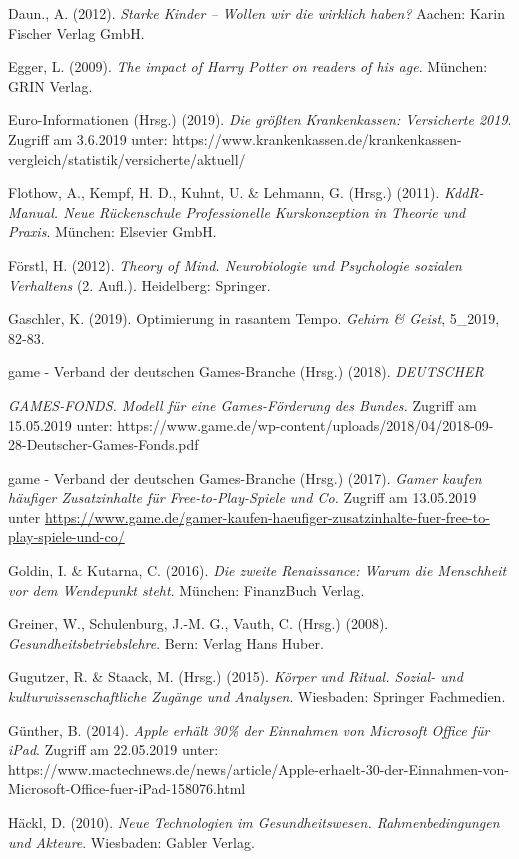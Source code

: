 \documentclass[
  a4paper,
  DIV=11,
  numbers=noendperiod,
  onecolumn,
  oneside,
  a4paper]{scrartcl}
\begin{document}
Daun., A. (2012). \emph{Starke Kinder -- Wollen wir die wirklich haben?
}Aachen: Karin Fischer Verlag GmbH.

Egger, L. (2009). \emph{The impact of Harry Potter on readers of his
age}. München: GRIN Verlag.

Euro-Informationen (Hrsg.) (2019). \emph{Die größten Krankenkassen:
Versicherte 2019}. Zugriff am 3.6.2019 unter:
https://www.krankenkassen.de/krankenkassen-vergleich/statistik/versicherte/aktuell/

Flothow, A., Kempf, H. D., Kuhnt, U. \& Lehmann, G. (Hrsg.) (2011).
\emph{KddR-Manual. Neue Rückenschule Professionelle Kurskonzeption in
Theorie und Praxis}. München: Elsevier GmbH.

Förstl, H. (2012). \emph{Theory of Mind. Neurobiologie und Psychologie
sozialen Verhaltens} (2. Aufl.). Heidelberg: Springer.

Gaschler, K. (2019). Optimierung in rasantem Tempo. \emph{Gehirn \&
Geist}, 5\_2019, 82-83.

game - Verband der deutschen Games-Branche (Hrsg.) (2018).
\emph{DEUTSCHER}

\emph{GAMES-FONDS. Modell für eine Games-Förderung des Bundes. }Zugriff
am 15.05.2019 unter:
https://www.game.de/wp-content/uploads/2018/04/2018-09-28-Deutscher-Games-Fonds.pdf

game - Verband der deutschen Games-Branche (Hrsg.) (2017). \emph{Gamer
kaufen häufiger Zusatzinhalte für Free-to-Play-Spiele und Co.} Zugriff
am 13.05.2019 unter
\url{https://www.game.de/gamer-kaufen-haeufiger-zusatzinhalte-fuer-free-to-play-spiele-und-co/}

Goldin, I. \& Kutarna, C. (2016). \emph{Die zweite Renaissance: Warum
die Menschheit vor dem Wendepunkt steht}. München: FinanzBuch Verlag.

Greiner, W., Schulenburg, J.-M. G., Vauth, C. (Hrsg.) (2008).
\emph{Gesundheitsbetriebslehre}. Bern: Verlag Hans Huber.

Gugutzer, R. \& Staack, M. (Hrsg.) (2015). \emph{Körper und Ritual.
Sozial- und kulturwissenschaftliche Zugänge und Analysen}. Wiesbaden:
Springer Fachmedien.

Günther, B. (2014). \emph{Apple erhält 30\% der Einnahmen von Microsoft
Office für iPad}. Zugriff am 22.05.2019 unter:
https://www.mactechnews.de/news/article/Apple-erhaelt-30-der-Einnahmen-von-Microsoft-Office-fuer-iPad-158076.html

Häckl, D. (2010). \emph{Neue Technologien im Gesundheitswesen.
Rahmenbedingungen und Akteure}. Wiesbaden: Gabler Verlag.
\end{document}
